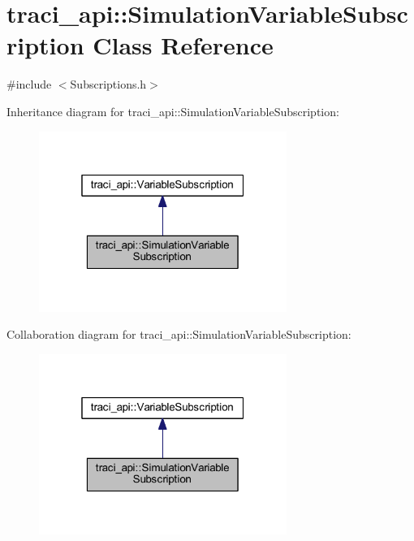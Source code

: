 \hypertarget{classtraci__api_1_1_simulation_variable_subscription}{}\section{traci\+\_\+api\+:\+:Simulation\+Variable\+Subscription Class Reference}
\label{classtraci__api_1_1_simulation_variable_subscription}


{\ttfamily \#include $<$Subscriptions.\+h$>$}



Inheritance diagram for traci\+\_\+api\+:\+:Simulation\+Variable\+Subscription\+:\nopagebreak
\begin{figure}[H]
\begin{center}
\leavevmode
\includegraphics[width=229pt]{classtraci__api_1_1_simulation_variable_subscription__inherit__graph}
\end{center}
\end{figure}


Collaboration diagram for traci\+\_\+api\+:\+:Simulation\+Variable\+Subscription\+:\nopagebreak
\begin{figure}[H]
\begin{center}
\leavevmode
\includegraphics[width=229pt]{classtraci__api_1_1_simulation_variable_subscription__coll__graph}
\end{center}
\end{figure}
